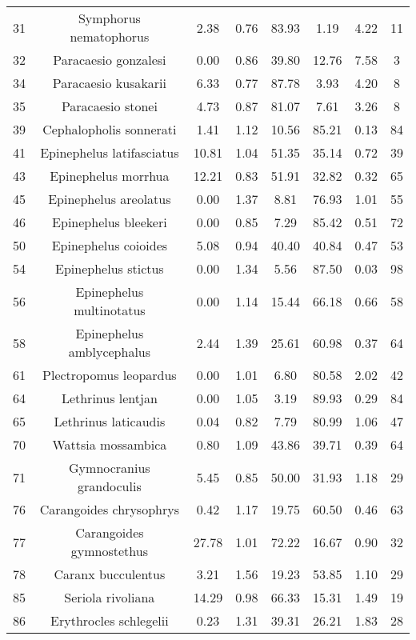 \documentclass{report}\usepackage[]{graphicx}\usepackage[]{color}
\begin{document}
\begin{table}[ht]
{\begin{tabular}{cccccccc}
   31 & Symphorus nematophorus & 2.38 & 0.76 & 83.93 & 1.19 & 4.22 & 11 \\ 
   32 & Paracaesio gonzalesi & 0.00 & 0.86 & 39.80 & 12.76 & 7.58 & 3 \\ 
   34 & Paracaesio kusakarii & 6.33 & 0.77 & 87.78 & 3.93 & 4.20 & 8 \\ 
   35 & Paracaesio stonei & 4.73 & 0.87 & 81.07 & 7.61 & 3.26 & 8 \\ 
   39 & Cephalopholis sonnerati & 1.41 & 1.12 & 10.56 & 85.21 & 0.13 & 84 \\ 
   41 & Epinephelus latifasciatus & 10.81 & 1.04 & 51.35 & 35.14 & 0.72 & 39 \\ 
   43 & Epinephelus morrhua & 12.21 & 0.83 & 51.91 & 32.82 & 0.32 & 65 \\ 
   45 & Epinephelus areolatus & 0.00 & 1.37 & 8.81 & 76.93 & 1.01 & 55 \\ 
   46 & Epinephelus bleekeri & 0.00 & 0.85 & 7.29 & 85.42 & 0.51 & 72 \\ 
   50 & Epinephelus coioides & 5.08 & 0.94 & 40.40 & 40.84 & 0.47 & 53 \\ 
   54 & Epinephelus stictus & 0.00 & 1.34 & 5.56 & 87.50 & 0.03 & 98 \\ 
   56 & Epinephelus multinotatus & 0.00 & 1.14 & 15.44 & 66.18 & 0.66 & 58 \\ 
   58 & Epinephelus amblycephalus & 2.44 & 1.39 & 25.61 & 60.98 & 0.37 & 64 \\ 
   61 & Plectropomus leopardus & 0.00 & 1.01 & 6.80 & 80.58 & 2.02 & 42 \\ 
   64 & Lethrinus lentjan & 0.00 & 1.05 & 3.19 & 89.93 & 0.29 & 84 \\ 
   65 & Lethrinus laticaudis & 0.04 & 0.82 & 7.79 & 80.99 & 1.06 & 47 \\ 
   70 & Wattsia mossambica & 0.80 & 1.09 & 43.86 & 39.71 & 0.39 & 64 \\ 
   71 & Gymnocranius grandoculis & 5.45 & 0.85 & 50.00 & 31.93 & 1.18 & 29 \\ 
   76 & Carangoides chrysophrys & 0.42 & 1.17 & 19.75 & 60.50 & 0.46 & 63 \\ 
   77 & Carangoides gymnostethus & 27.78 & 1.01 & 72.22 & 16.67 & 0.90 & 32 \\ 
   78 & Caranx bucculentus & 3.21 & 1.56 & 19.23 & 53.85 & 1.10 & 29 \\ 
   85 & Seriola rivoliana & 14.29 & 0.98 & 66.33 & 15.31 & 1.49 & 19 \\ 
   86 & Erythrocles schlegelii & 0.23 & 1.31 & 39.31 & 26.21 & 1.83 & 28 \\ 

\end{tabular}}
\end{table}
\end{document}
